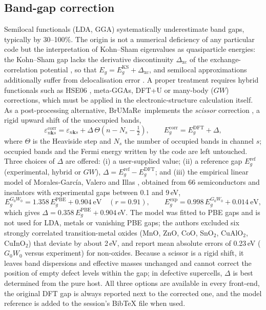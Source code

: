 \documentclass[11pt,a4paper]{article}
\newcommand{\BMR}{\textsf{BrUMa\textcolor[HTML]{B26B00}{Re}}}
\begin{document}
\subsection{Band-gap correction}\label{sec:gapcorr}
Semilocal functionals (LDA, GGA) systematically underestimate band gaps, typically by 30–100\%. The origin is not a numerical deficiency of any particular code but the interpretation of Kohn–Sham eigenvalues as quasiparticle energies: the Kohn–Sham gap lacks the derivative discontinuity $\Delta_\mathrm{xc}$ of the exchange-correlation potential \cite{perdew1983,sham1983}, so that $E_g=E_g^\mathrm{KS}+\Delta_\mathrm{xc}$, and semilocal approximations additionally suffer from delocalisation error \cite{morisanchez2008}. A proper treatment requires hybrid functionals such as HSE06 \cite{heyd2003}, meta-GGAs, DFT+U or many-body ($GW$) corrections, which must be applied in the electronic-structure calculation itself. As a post-processing alternative, \BMR\ implements the \emph{scissor} correction \cite{levine1989}, a rigid upward shift of the unoccupied bands,
\begin{equation}
\varepsilon^\mathrm{corr}_{n\bm{k} s}=\varepsilon_{n\bm{k} s}+\Delta\,\Theta(n-N_s-\tfrac12),\qquad E_g^\mathrm{corr}=E_g^\mathrm{DFT}+\Delta,
\end{equation}
where $\Theta$ is the Heaviside step and $N_s$ the number of occupied bands in channel $s$; occupied bands and the Fermi energy written by the code are left untouched. Three choices of $\Delta$ are offered: (i) a user-supplied value; (ii) a reference gap $E_g^\mathrm{ref}$ (experimental, hybrid or $GW$), $\Delta=E_g^\mathrm{ref}-E_g^\mathrm{DFT}$; and (iii) the empirical linear model of Morales-García, Valero and Illas \cite{morales2017}, obtained from 66 semiconductors and insulators with experimental gaps between 0.1 and 9\,eV,
\begin{equation}
E_g^{G_0W_0}=1.358\,E_g^\mathrm{PBE}+0.904\ \mathrm{eV}\quad(r=0.91),\qquad E_g^\mathrm{exp}=0.998\,E_g^{G_0W_0}+0.014\ \mathrm{eV},
\end{equation}
which gives $\Delta=0.358\,E_g^\mathrm{PBE}+0.904$\,eV. The model was fitted to PBE gaps and is not used for LDA, metals or vanishing PBE gaps; the authors excluded six strongly correlated transition-metal oxides (MnO, ZnO, CoO, SnO$_2$, CuAlO$_2$, CuInO$_2$) that deviate by about 2\,eV, and report mean absolute errors of 0.23\,eV ($G_0W_0$ versus experiment) for non-oxides. Because a scissor is a rigid shift, it leaves band dispersions and effective masses unchanged and cannot correct the position of empty defect levels within the gap; in defective supercells, $\Delta$ is best determined from the pure host. All three options are available in every front-end, the original DFT gap is always reported next to the corrected one, and the model reference is added to the session's BibTeX file when used.
\end{document}
